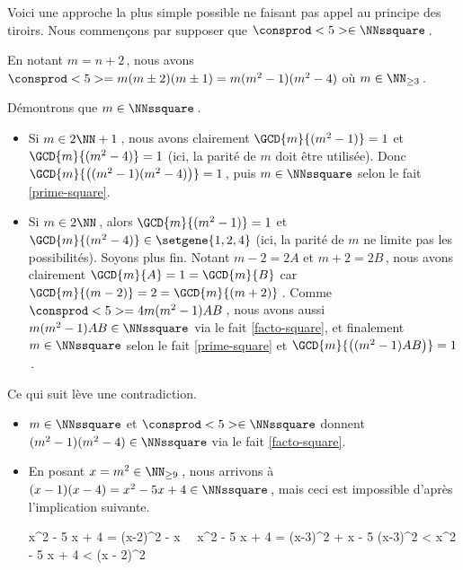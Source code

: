 Voici une approche la plus simple possible ne faisant pas appel au principe des tiroirs.
Nous commençons par supposer que $\consprod<5> \in \NNssquare$\,.
    
\smallskip

En notant $m = n+2$\,, nous avons $\consprod<5> = m (m \pm 2) (m \pm 1) = m (m^2 - 1) (m^2 - 4)$ où $m \in \NN_{\geq 3}$\,.

\medskip

Démontrons que $m \in \NNssquare$\,.
%	
\begin{itemize}
	\item Si $m \in 2 \NN + 1$\,, nous avons clairement $\GCD{m}{(m^2 - 1)} = 1$ et $\GCD{m}{(m^2 - 4)} = 1$ (ici, la parité de $m$ doit être utilisée).
	Donc $\GCD{m}{\big( (m^2 - 1) (m^2 - 4) \big)} = 1$\,, puis $m \in \NNssquare$ selon le fait \ref{prime-square}.


	\item Si $m \in 2 \NN$\,, alors $\GCD{m}{(m^2 - 1)} = 1$ et $\GCD{m}{(m^2 - 4)} \in \setgene{1, 2, 4}$ (ici, la parité de $m$ ne limite pas les possibilités). Soyons plus fin.
	Notant $m - 2 = 2A$ et $m + 2 = 2B$\,, nous avons clairement $\GCD{m}{A} = 1 = \GCD{m}{B}$ car $\GCD{m}{(m - 2)} = 2 = \GCD{m}{(m + 2)}$\,.
	Comme $\consprod<5> = 4 m (m^2 - 1) A B$\,, nous avons aussi $m (m^2 - 1) A B \in \NNssquare$ via le fait \ref{facto-square}, et finalement $m \in \NNssquare$ selon le fait \ref{prime-square} et $\GCD{m}{\big( (m^2 - 1) A B \big)} = 1$\,. 
\end{itemize}

\medskip

Ce qui suit lève une contradiction.
%	
\begin{itemize}
	\item $m \in \NNssquare$ et $\consprod<5> \in \NNssquare$ donnent $(m^2 - 1) (m^2 - 4) \in \NNssquare$ via le fait \ref{facto-square}. 

	\item En posant $x = m^2 \in \NN_{\geq 9}$\,, nous arrivons à $(x - 1) (x - 4) = x^2 - 5 x + 4 \in \NNssquare$\,, mais ceci est impossible d'après l'implication suivante.
		
	\noindent\kern-10pt%
	\begin{stepcalc}[style=ar*, ope={\implies}]
		x^2 - 5 x + 4 = (x-2)^2 - x
		\,\,\,\,
		x^2 - 5 x + 4 = (x-3)^2 + x - 5
		(x-3)^2 < x^2 - 5 x + 4 < (x - 2)^2
	\end{stepcalc}
\end{itemize}

\vspace{-1.5ex}
\qedhere